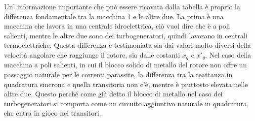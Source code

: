 \documentclass[Lau,noexaminfo]{sapthesis}
\begin{document}
	Un' informazione importante che può essere ricavata dalla tabella è proprio la differenza fondamentale tra la macchina 1 e le altre due. La prima è una macchina che lavora in una centrale idroelettrica, ciò vuol dire che è a poli salienti, mentre le altre due sono dei turbogeneratori, quindi lavorano in centrali termoelettriche. Questa differenza è testimoniata sia dai valori molto diversi della velocità angolare che raggiunge il rotore, sia dalle costanti $x_q$ e $x'_q$. Nel caso della macchina a poli salienti, in cui il blocco solido di metallo del rotore non offre un passaggio naturale per le correnti parassite, la differenza tra la reattanza in quadratura sincrona e quella transitoria non c'è, mentre è piuttosto elevata nelle altre due. Questo perché come già detto il blocco di metallo nel caso dei turbogeneratori si comporta come un circuito aggiuntivo naturale in quadratura, che entra in gioco nei transitori.
\end{document}
